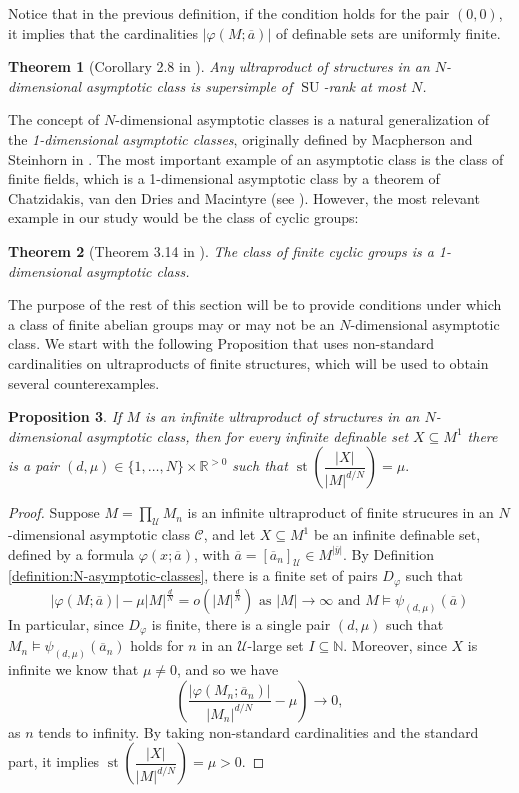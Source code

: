 \documentclass[10pt,a4paper]{amsart}
\newtheorem{prop}{Proposition}[section]
\newtheorem{teor}[prop]{Theorem}
\theoremstyle{definition}
\newcommand{\bp}{\begin{prop}}
\newcommand{\ep}{\end{prop}}
\newcommand{\bdem}{\begin{proof}}
\newcommand{\edem}{\end{proof}}
\newcommand{\bt}{\begin{teor}}
\newcommand{\et}{\end{teor}}
\newcommand{\ov}[1]{\overline{#1}}
\begin{document}
Notice that in the previous definition, if the condition holds for the pair $(0,0)$, it implies that the cardinalities $|\varphi(M;\ov{a})|$ of definable sets are uniformly finite.
\bt [Corollary 2.8 in \cite{Elwes-AsymptoticClasses}] \label{SuperstabilityAsymptoticClasses} Any ultraproduct of structures in an $N$-dimensional asymptotic class is supersimple of $\operatorname{SU}$-rank at most $N$.
\et

The concept of $N$-dimensional asymptotic classes is a natural generalization of the \emph{1-dimensional asymptotic classes}, originally defined by Macpherson and Steinhorn in \cite{Macpherson-Steinhorn}. The most important example of an asymptotic class is the class of finite fields, which is a 1-dimensional asymptotic class by a theorem of Chatzidakis, van den Dries and Macintyre (see \cite{MR1162433}). However, the most relevant example in our study would be the class of cyclic groups:

\bt [Theorem 3.14 in \cite{Macpherson-Steinhorn}] The class of finite cyclic groups is a 1-dimensional asymptotic class.
\et

The purpose of the rest of this section will be to provide conditions under which a class of finite abelian groups may or may not be an $N$-dimensional asymptotic class. We start with the following Proposition that uses non-standard cardinalities on ultraproducts of finite structures, which will be used to obtain several counterexamples.

\bp \label{Proposition:N-dimensional-mu} If $M$ is an infinite ultraproduct of structures in an $N$-dimensional asymptotic class, then for every infinite definable set $X\subseteq M^1$ there is a pair $(d,\mu)\in \{1,\ldots,N\}\times \mathbb{R}^{>0}$ such that $\operatorname{st}\left(\dfrac{|X|}{|M|^{d/N}}\right)=\mu.$
\ep
\bdem Suppose $M=\prod_{\mathcal{U}}M_n$ is an infinite ultraproduct of finite strucures in an $N$-dimensional asymptotic class $\mathcal{C}$, and let $X\subseteq M^1$ be an infinite definable set, defined by a formula $\varphi(x;\ov{a})$, with $\ov{a}=[\ov{a}_n]_\mathcal{U}\in M^{|\ov{y}|}$. By Definition \ref{definition:N-asymptotic-classes}, there is a finite set of pairs $D_\varphi$ such that
\[|\varphi(M;\ov{a})|-\mu|M|^{\frac{d}{N}}=o(|M|^{\frac{d}{N}}) \text{\ \ \ as $|M|\to\infty$ and $M\models \psi_{(d,\mu)}(\ov{a})$}\]
In particular, since $D_\varphi$ is finite, there is a single pair $(d,\mu)$ such that $M_n\models \psi_{(d,\mu)}(\ov{a}_n)$ holds for $n$ in an $\mathcal{U}$-large set $I\subseteq \mathbb{N}$. Moreover, since $X$ is infinite we know that $\mu\neq 0$, and so  we have 
\[\left(\dfrac{|\varphi(M_n;\ov{a}_n)|}{|M_n|^{d/N}}-\mu\right)\to 0,\]
as $n$ tends to infinity. By taking non-standard cardinalities and the standard part, it implies $\operatorname{st}\left(\dfrac{|X|}{|M|^{d/N}}\right)=\mu>0.$
\edem
\end{document}
